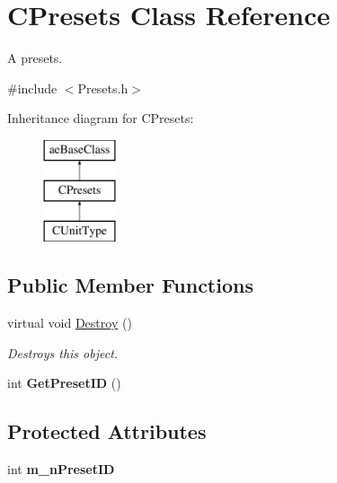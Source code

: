 \hypertarget{class_c_presets}{}\section{C\+Presets Class Reference}
\label{class_c_presets}


A presets.  




{\ttfamily \#include $<$Presets.\+h$>$}

Inheritance diagram for C\+Presets\+:\begin{figure}[H]
\begin{center}
\leavevmode
\includegraphics[height=3.000000cm]{class_c_presets}
\end{center}
\end{figure}
\subsection*{Public Member Functions}
\begin{DoxyCompactItemize}
\item 
virtual void \hyperlink{class_c_presets_a100e0eaf0c389280d441f233fbf48b2f}{Destroy} ()\hypertarget{class_c_presets_a100e0eaf0c389280d441f233fbf48b2f}{}\label{class_c_presets_a100e0eaf0c389280d441f233fbf48b2f}

\begin{DoxyCompactList}\small\item\em Destroys this object. \end{DoxyCompactList}\item 
int {\bfseries Get\+Preset\+ID} ()\hypertarget{class_c_presets_a0cca459dd8d070d1630c432ad931942d}{}\label{class_c_presets_a0cca459dd8d070d1630c432ad931942d}

\end{DoxyCompactItemize}
\subsection*{Protected Attributes}
\begin{DoxyCompactItemize}
\item 
int {\bfseries m\+\_\+n\+Preset\+ID}\hypertarget{class_c_presets_ae37f231aef09cbc0526f184c9a4ec4b4}{}\label{class_c_presets_ae37f231aef09cbc0526f184c9a4ec4b4}

\end{DoxyCompactItemize}


